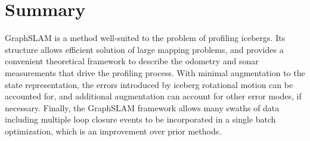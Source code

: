\section{Summary}

GraphSLAM is a method well-suited to the problem of profiling icebergs. Its structure allows efficient solution of large mapping problems, and provides a convenient theoretical framework to describe the odometry and sonar measurements that drive the profiling process. With minimal augmentation to the state representation, the errors introduced by iceberg rotational motion can be accounted for, and additional augmentation can account for other error modes, if necessary. Finally, the GraphSLAM framework allows many swaths of data including multiple loop closure events to be incorporated in a single batch optimization, which is an improvement over prior methods.